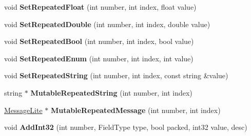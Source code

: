 \begin{DoxyCompactItemize}
void {\bfseries Set\+Repeated\+Float} (int number, int index, float value)
\item 
\mbox{\label{classgoogle_1_1protobuf_1_1internal_1_1ExtensionSet_aad59d6f89ae75376a1eb83ad4d6b2d3c}} 
void {\bfseries Set\+Repeated\+Double} (int number, int index, double value)
\item 
\mbox{\label{classgoogle_1_1protobuf_1_1internal_1_1ExtensionSet_a9546c045e30804eebd662f47ed833743}} 
void {\bfseries Set\+Repeated\+Bool} (int number, int index, bool value)
\item 
\mbox{\label{classgoogle_1_1protobuf_1_1internal_1_1ExtensionSet_afae8a7025b483dcf88511b902d7887a9}} 
void {\bfseries Set\+Repeated\+Enum} (int number, int index, int value)
\item 
\mbox{\label{classgoogle_1_1protobuf_1_1internal_1_1ExtensionSet_a371f400ce451b06d7bbe4ff4ea5a65bf}} 
void {\bfseries Set\+Repeated\+String} (int number, int index, const string \&value)
\item 
\mbox{\label{classgoogle_1_1protobuf_1_1internal_1_1ExtensionSet_a27f14aad15a0c83ab14f2d3464796929}} 
string $\ast$ {\bfseries Mutable\+Repeated\+String} (int number, int index)
\item 
\mbox{\label{classgoogle_1_1protobuf_1_1internal_1_1ExtensionSet_a106fe65dfb456887ef3dab71f1b6772f}} 
\hyperlink{classgoogle_1_1protobuf_1_1MessageLite}{Message\+Lite} $\ast$ {\bfseries Mutable\+Repeated\+Message} (int number, int index)
\item 
\mbox{\label{classgoogle_1_1protobuf_1_1internal_1_1ExtensionSet_add2e454161de6f37d25ad755c21fabad}} 
void {\bfseries Add\+Int32} (int number, Field\+Type type, bool packed, int32 value, desc)
\item 
\mbox{\label{classgoogle_1_1protobuf_1_1internal_1_1ExtensionSet_aafdde4f995fb02be56cc283625b40aa6}} 

\end{DoxyCompactItemize}
